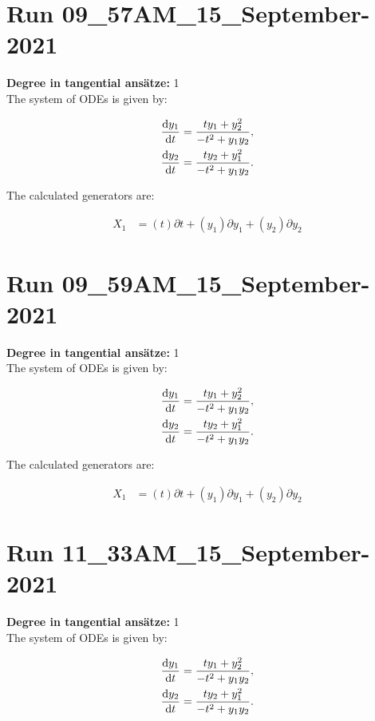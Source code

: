 \section*{Run 09\_57AM\_15\_September-2021}
\textbf{Degree in tangential ansätze:}	1\\
The system of ODEs is given by:

\begin{align*}
\dv{y_{1}}{t}&=\frac{t y_{1} + y_{2}^{2}}{- t^{2} + y_{1} y_{2}},\\
\dv{y_{2}}{t}&=\frac{t y_{2} + y_{1}^{2}}{- t^{2} + y_{1} y_{2}}.\\
\end{align*}

\noindent The calculated generators are:

\begin{align*}
X_{1}&=\left( t \right)\partial t+\left( y_{1} \right)\partial y_{1}+\left( y_{2} \right)\partial y_{2}\end{align*}
\section*{Run 09\_59AM\_15\_September-2021}
\textbf{Degree in tangential ansätze:}	1\\
The system of ODEs is given by:

\begin{align*}
\dv{y_{1}}{t}&=\frac{t y_{1} + y_{2}^{2}}{- t^{2} + y_{1} y_{2}},\\
\dv{y_{2}}{t}&=\frac{t y_{2} + y_{1}^{2}}{- t^{2} + y_{1} y_{2}}.\\
\end{align*}

\noindent The calculated generators are:

\begin{align*}
X_{1}&=\left( t \right)\partial t+\left( y_{1} \right)\partial y_{1}+\left( y_{2} \right)\partial y_{2}\end{align*}
\section*{Run 11\_33AM\_15\_September-2021}
\textbf{Degree in tangential ansätze:}	1\\
The system of ODEs is given by:

\begin{align*}
\dv{y_{1}}{t}&=\frac{t y_{1} + y_{2}^{2}}{- t^{2} + y_{1} y_{2}},\\
\dv{y_{2}}{t}&=\frac{t y_{2} + y_{1}^{2}}{- t^{2} + y_{1} y_{2}}.\\
\end{align*}

